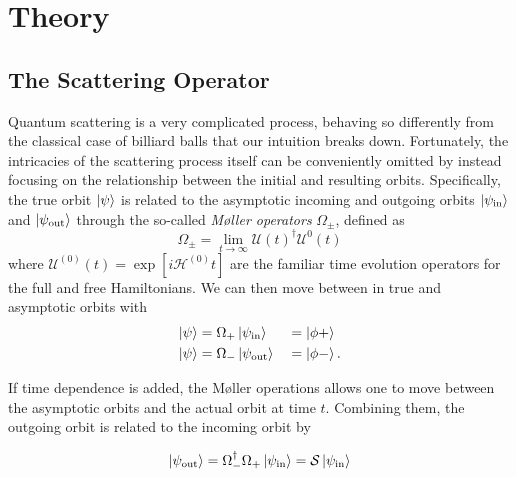 \section{Theory}\label{sec:Theory}
\subsection{The Scattering Operator}

\newcommand{\state}{\ket{\psi}}
\newcommand{\hoket}{\ket{\phi}}
\newcommand{\hoep}{\ket{\phi +}}
\newcommand{\hoem}{\ket{\phi -}}
\newcommand{\pin}{\psi_\text{in}}
\newcommand{\pout}{\psi_\text{out}}
\newcommand{\kpin}{\ket{\psi_\text{in}}}
\newcommand{\kpout}{\ket{\psi_\text{out}}}
\newcommand{\mop}{\Omega_{+}}
\newcommand{\mom}{\Omega_{-}}
\newcommand{\melt}[3]{\left|\mel{#1}{#2}{#3}\right|^{2}}
\newcommand{\scat}{\mathcal{S}}
\newcommand{\mscat}{\(\scat\)}
\newcommand{\oop}[1]{\mathcal{#1}}
\newcommand{\moop}[1]{\(\oop{#1}\)}
\renewcommand{\vu}[1]{\mathbf{\hat{\text{$#1$}}}}
Quantum scattering is a very complicated process, behaving so differently from the
classical case of billiard balls that our intuition breaks down. Fortunately, the intricacies of
the scattering process itself can be conveniently omitted by instead focusing on
the relationship between the initial and resulting orbits.
Specifically, the true orbit \(\ket{\psi}\) is related to the asymptotic
incoming and outgoing orbits \(\kpin\) and \(\kpout\) through the so-called
\textit{M\o ller operators} \(\Omega_{\pm}\), defined
as
\begin{equation*}
  \Omega_{\pm} = \lim_{t\to\infty} \oop{U}(t)^{\dagger}\oop{U}^{0}(t)
\end{equation*}
where \(\oop{U}^{(0)}(t)=\exp\left[ i\oop{H}^{(0)}t \right]\) are the familiar time evolution
operators for the full and free Hamiltonians. We can then move between in true
and asymptotic orbits with
\renewcommand{\thefootnote}{\alph{footnote}}
\begin{alignat*}{2}
  \state &= \mop\kpin  &&= \hoep\\
  \state &= \mom\kpout &&= \hoem .
\end{alignat*}

If time dependence is added, the M\o{}ller operations allows one to move between
the asymptotic orbits and the actual orbit at time \(t\).
Combining them, the outgoing orbit is related to the incoming orbit by

\begin{equation*}
  \kpout = \mom^{\dagger}\mop\kpin = \scat\kpin
\end{equation*}

